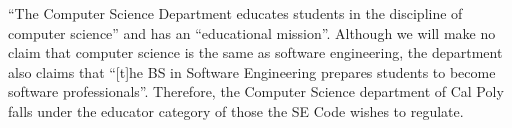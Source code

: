 \documentclass[11pt]{article}
\begin{document}
\begin{multicols}{2}

``The Computer Science Department educates students in the discipline of computer science'' and has an ``educational mission''. \cite{catalogDept}  Although we will make no claim that computer science is the same as software engineering, the department also claims that ``[t]he BS in Software Engineering prepares students to become software professionals''. \cite{catalogDept}  Therefore, the Computer Science department of Cal Poly falls under the educator category of those the SE Code wishes to regulate.



\end{multicols}
\end{document}
